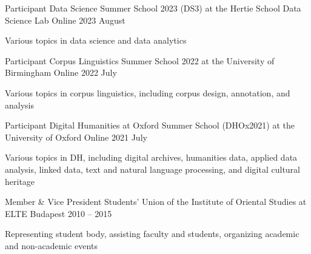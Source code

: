 
\begin{cventries}

  
  \cventry
    {Participant} %
    {Data Science Summer School 2023 (DS3) at the Hertie School Data Science Lab} %
    {Online} %
    {2023 August} %
    {
      \begin{cvitems} %
        \item {Various topics in data science and data analytics}
      \end{cvitems}
    }
    
  \cventry
    {Participant} %
    {Corpus Linguistics Summer School 2022 at the University of Birmingham} %
    {Online} %
    {2022 July} %
    {
      \begin{cvitems} %
        \item {Various topics in corpus linguistics, including corpus design, annotation, and analysis}
      \end{cvitems}
    }

    \cventry
    {Participant} %
    {Digital Humanities at Oxford Summer School (DHOx2021) at the University of Oxford} %
    {Online} %
    {2021 July} %
    {
      \begin{cvitems} %
        \item {Various topics in DH, including digital archives, humanities data, applied data analysis, linked data, text and natural language processing, and digital cultural heritage}
      \end{cvitems}
    }
    

  \cventry
    {Member \& Vice President} %
    {Students’ Union of the Institute of Oriental Studies at ELTE} %
    {Budapest} %
    {2010 -- 2015} %
    {
      \begin{cvitems} %
        \item {Representing student body, assisting faculty and students, organizing academic and non-academic events}
      \end{cvitems}
    }
  

\end{cventries}
